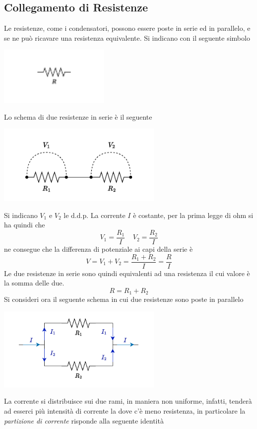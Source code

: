 \documentclass[10pt, letterpaper]{report}
\begin{document}
\subsection{Collegamento di Resistenze}
Le resistenze, come i condensatori, possono essere poste in serie ed in parallelo, e se ne può ricavare una resistenza equivalente. Si indicano con il seguente simbolo\begin{center}
    \includegraphics[width=0.4\textwidth]{images/resistenza.pdf}
\end{center}
Lo schema di due resistenze in serie è il seguente 
\begin{center}
    \includegraphics[width=0.6\textwidth]{images/resistenzaSerie.pdf}
\end{center} 
Si indicano $V_1$ e $V_2$ le d.d.p. La corrente $I$ è costante, per la prima legge di ohm si ha quindi che 
$$ V_1=\frac{R_1}{I} \ \ \ \ \ V_2=\frac{R_2}{I}$$
ne consegue che la differenza di potenziale ai capi della serie è
$$ V=V_1+V_2=\frac{R_1+R_2}{I}=\frac{R}{I}$$
Le due resistenze in serie sono quindi equivalenti ad una resistenza il cui valore è la somma delle due. 
$$ R=R_1+R_2$$
Si consideri ora il seguente schema in cui due resistenze sono poste in parallelo\begin{center}
    \includegraphics[width=0.6\textwidth]{images/resistenzeParallelo.pdf}
\end{center}
La corrente si distribuisce sui due rami, in maniera non uniforme, infatti, tenderà ad esserci più intensità di corrente la dove c'è meno resistenza, in particolare la \textit{partizione di corrente} risponde alla seguente identità
\end{document}
